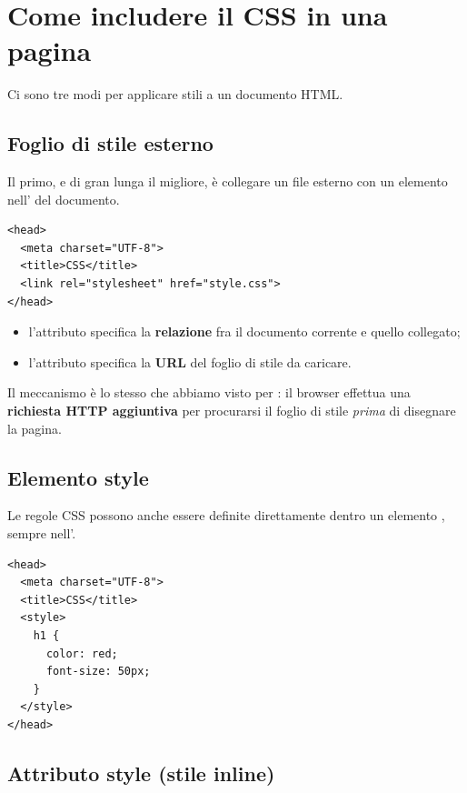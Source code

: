 \section{Come includere il CSS in una pagina}

Ci sono tre modi per applicare stili a un documento HTML.

\subsection{Foglio di stile esterno}

Il primo, e di gran lunga il migliore, è collegare un file  esterno
con un elemento  nell' del documento.

\begin{lstlisting}[style=html, name=head con foglio esterno]
<head>
  <meta charset="UTF-8">
  <title>CSS</title>
  <link rel="stylesheet" href="style.css">
</head>
\end{lstlisting}

\begin{itemize}
  \item l'attributo  specifica la \textbf{relazione} fra
        il documento corrente e quello collegato;
  \item l'attributo  specifica la \textbf{URL} del foglio
        di stile da caricare.
\end{itemize}

Il meccanismo è lo stesso che abbiamo visto per : il browser effettua
una \textbf{richiesta HTTP aggiuntiva} per procurarsi il foglio di stile
\textit{prima} di disegnare la pagina.

\subsection{Elemento style}

Le regole CSS possono anche essere definite direttamente dentro un elemento
, sempre nell'.

\begin{lstlisting}[style=html, name=head con style interno]
<head>
  <meta charset="UTF-8">
  <title>CSS</title>
  <style>
    h1 {
      color: red;
      font-size: 50px;
    }
  </style>
</head>
\end{lstlisting}

\subsection{Attributo style (stile inline)}

